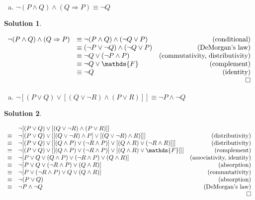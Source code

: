 \documentclass{article}
\theoremstyle{definition}
\newtheorem*{solution}{Solution}
\begin{document}
\begin{enumerate}[(b)]
\item \( \neg (P \land Q) \land (Q \Rightarrow P) \equiv \neg Q \)
\end{enumerate}

\begin{solution}
\end{solution}

\(
\begin{array}{llr}
	\neg (P \land Q) \land (Q \Rightarrow P) &\equiv \neg (P \land Q) \land (\neg Q \lor P) & \text{(conditional)} \\
	&\equiv (\neg P \lor \neg Q) \land (\neg Q \lor P) & \text{(DeMorgan's law)} \\
	&\equiv \neg Q \lor (\neg P \land P) & \text{(commutativity, distributivity)} \\
	&\equiv \neg Q \lor \mathds{F} & \text{(complement)} \\
	&\equiv \neg Q & \text{(identity)} \\
	&&\qed
\end{array}
\)

\pagebreak

\begin{enumerate}[(c)]
\item \( \neg[(P \lor Q) \lor [(Q \lor \neg R) \land (P \lor R)]] \equiv \neg P \land \neg Q \)
\end{enumerate}

\begin{solution}
\end{solution}

\(
\begin{array}{llr}
	& \neg[(P \lor Q) \lor [(Q \lor \neg R) \land (P \lor R)]] \\
	\equiv & \neg[(P \lor Q) \lor [[(Q \lor \neg R) \land P] \lor [(Q \lor \neg R) \land R)]]] & \text{(distributivity)} \\
	\equiv & \neg[(P \lor Q) \lor [[(Q \land P) \lor (\neg R \land P)] \lor [(Q \land R) \lor (\neg R \land R)]]] & \text{(distributivity)} \\
	\equiv & \neg[(P \lor Q) \lor [[(Q \land P) \lor (\neg R \land P)] \lor [(Q \land R) \lor \mathds{F}]]] & \text{(complement)} \\
	\equiv & \neg[P \lor Q \lor (Q \land P) \lor (\neg R \land P) \lor (Q \land R)] & \text{(associativity, identity)} \\
	\equiv & \neg[P \lor Q \lor (\neg R \land P) \lor (Q \land R)] & \text{(absorption)} \\
	\equiv & \neg[P \lor (\neg R \land P) \lor Q \lor (Q \land R)] & \text{(commutativity)} \\ 
	\equiv & \neg(P \lor Q) & \text{(absorption)} \\ 
	\equiv & \neg P \land \neg Q & \text{(DeMorgan's law)} \\
	&&\qed
\end{array}
\)
\end{document}
